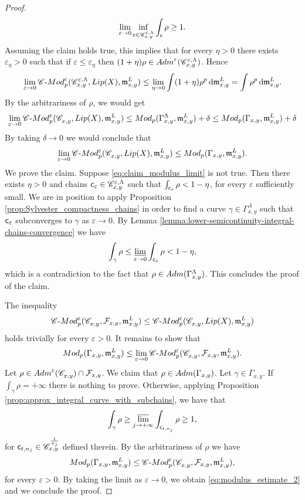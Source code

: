 \documentclass[12pt]{amsart}
\renewcommand{\d}{{\mathrm d}}
\newcommand{\limi}{\varliminf}
\newcommand{\lims}{\varlimsup}
\newcommand{\X}{{\rm X}}
\newcommand{\Lip}{{\rm Lip}}
\newcommand{\mm}{\mathfrak m}
\theoremstyle{definition}
\newcommand{\Mod}{\textup{Mod}}
\newcommand{\cModepsilon}[2]{{\mathscr C}\text{-}{\rm Mod}_{#2}^{#1}}
\newcommand{\sfc}{{\sf c}}
\newcommand{\Chain}[1]{\mathscr{C}^{#1}}
\begin{document}
\begin{proof}
\begin{equation}
        \label{eq:claim_modulus_limit}
        \lim_{\varepsilon \to 0} \inf_{\sfc \in \Chain{\varepsilon, \Lambda}_{x,y}} \int_\sfc \rho \ge 1.
    \end{equation}
    Assuming the claim holds true, this implies that for every $\eta > 0$ there exists $\varepsilon_\eta >0$ such that if $\varepsilon \le \varepsilon_\eta$ then $(1+\eta)\rho \in {\rm Adm}^\varepsilon(\Chain{\varepsilon,\Lambda}_{x,y})$. Hence
    $$\lim_{\varepsilon \to 0} \cModepsilon{\varepsilon}{p}(\Chain{\varepsilon, \Lambda}_{x,y}, \Lip(\X) ,\mm_{x,y}^L) \le \lim_{\eta \to 0} \int (1+\eta)\rho^p\,\d\mm_{x,y}^L = \int \rho^p\,\d\mm_{x,y}^L.$$
    By the arbitrariness of $\rho$, we would get 
    $$\lim_{\varepsilon \to 0} \cModepsilon{\varepsilon}{p}(\Chain{}_{x,y}, \Lip(\X) ,\mm_{x,y}^L) \le \Mod_p(\Gamma_{x,y}^\Lambda, \mm_{x,y}^L) + \delta \le \Mod_p(\Gamma_{x,y}, \mm_{x,y}^L) + \delta$$
    By taking $\delta \to 0$ we would conclude that 
    $$\lim_{\varepsilon \to 0} \cModepsilon{\varepsilon}{p}(\Chain{}_{x,y}, \Lip(\X) ,\mm_{x,y}^L) \le \Mod_p(\Gamma_{x,y}, \mm_{x,y}^L).$$
    We prove the claim. Suppose \eqref{eq:claim_modulus_limit} is not true. Then there exists $\eta > 0$ and chains $\sfc_\varepsilon \in \Chain{\varepsilon,\Lambda}_{x,y}$ such that $\int_{\sfc_{\varepsilon}} \rho < 1-\eta$, for every $\varepsilon$ sufficiently small. We are in position to apply Proposition \ref{prop:Sylvester_compactness_chains} in order to find a curve $\gamma \in \Gamma_{x,y}^\Lambda$ such that $\sfc_{\varepsilon}$ subconverges to $\gamma$ as $\varepsilon \to 0$. By Lemma \ref{lemma:lower-semicontinuity-integral-chains-convergence} we have
    $$\int_\gamma \rho \le \limi_{\varepsilon \to 0} \int_{\sfc_\varepsilon} \rho < 1-\eta,$$
    which is a contradiction to the fact that $\rho \in {\rm Adm}(\Gamma_{x,y}^\Lambda)$. This concludes the proof of the claim.

    The inequality
    $$\cModepsilon{\varepsilon}{p}(\Chain{}_{x,y}, \mathcal{F}_{x,y} ,\mm_{x,y}^L) \le \cModepsilon{\varepsilon}{p}(\Chain{}_{x,y}, \Lip(\X), \mm_{x,y}^L)$$
    holds trivially for every $\varepsilon > 0$. It remains to show that
    \begin{equation}
        \label{eq:modulus_estimate_2}
        \Mod_p(\Gamma_{x,y}, \mm_{x,y}^L) \le \lim_{\varepsilon \to 0} \cModepsilon{\varepsilon}{p}(\Chain{}_{x,y}, \mathcal{F}_{x,y} ,\mm_{x,y}^L).
    \end{equation}
    Let $\rho \in {\rm Adm}^\varepsilon(\Chain{}_{x,y}) \cap \mathcal{F}_{x,y}$. We claim that $\rho \in {\rm Adm}(\Gamma_{x,y})$.    
    Let $\gamma \in \Gamma_{x,y}$. If $\int_\gamma \rho = +\infty$ there is nothing to prove. Otherwise, applying Proposition \ref{prop:approx_integral_curve_with_subchains}, we have that
    $$\int_\gamma \rho \ge \lims_{j\to +\infty} \int_{\sfc_{t,n_j}} \rho \ge 1,$$
    for $\sfc_{t,n_j} \in \Chain{\frac{1}{n_j}}_{x,y}$ defined therein.    
    By the arbitrariness of $\rho$ we have
    $$\Mod_p(\Gamma_{x,y}, \mm_{x,y}^L) \le  \cModepsilon{\varepsilon}{p}(\Chain{}_{x,y}, \mathcal{F}_{x,y} ,\mm_{x,y}^L),$$
    for every $\varepsilon > 0$. By taking the limit as $\varepsilon \to 0$, we obtain \eqref{eq:modulus_estimate_2} and we conclude the proof.
    

\end{proof}
\end{document}

